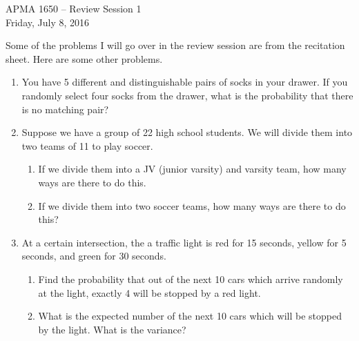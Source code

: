 \documentclass[12pt]{article}
\begin{document}
\title{}
\author{\vspace{-10ex} }

\begin{center}
{\LARGE APMA 1650 -- Review Session 1}\\
\vspace{5mm}
{\large Friday, July 8, 2016}\\
\end{center}

Some of the problems I will go over in the review session are from the recitation sheet. Here are some other problems.

\begin{enumerate}

\item You have 5 different and distinguishable pairs of socks in your drawer. If you randomly select four socks from the drawer, what is the probability that there is no matching pair?\\

\item Suppose we have a group of 22 high school students. We will divide them into two teams of 11 to play soccer.
\begin{enumerate}
\item If we divide them into a JV (junior varsity) and varsity team, how many ways are there to do this.\\

\item If we divide them into two soccer teams, how many ways are there to do this?\\

\end{enumerate}

\item At a certain intersection, the a traffic light is red for 15 seconds, yellow for 5 seconds, and green for 30 seconds.  
\begin{enumerate}
\item Find the probability that out of the next 10 cars which arrive randomly at the light, exactly 4 will be stopped by a red light.

\item What is the expected number of the next 10 cars which will be stopped by the light. What is the variance?\\

\end{enumerate}


\end{enumerate}
\end{document}
